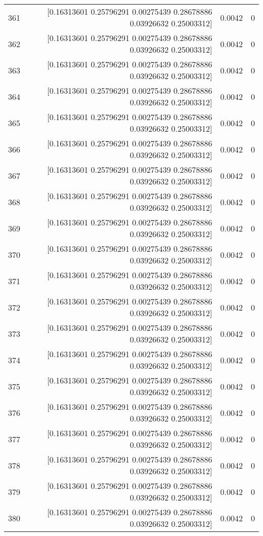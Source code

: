 \begin{longtable}{lrrr}
361 & [0.16313601 0.25796291 0.00275439 0.28678886 0.03926632 0.25003312] & 0.0042 & 0 \\
362 & [0.16313601 0.25796291 0.00275439 0.28678886 0.03926632 0.25003312] & 0.0042 & 0 \\
363 & [0.16313601 0.25796291 0.00275439 0.28678886 0.03926632 0.25003312] & 0.0042 & 0 \\
364 & [0.16313601 0.25796291 0.00275439 0.28678886 0.03926632 0.25003312] & 0.0042 & 0 \\
365 & [0.16313601 0.25796291 0.00275439 0.28678886 0.03926632 0.25003312] & 0.0042 & 0 \\
366 & [0.16313601 0.25796291 0.00275439 0.28678886 0.03926632 0.25003312] & 0.0042 & 0 \\
367 & [0.16313601 0.25796291 0.00275439 0.28678886 0.03926632 0.25003312] & 0.0042 & 0 \\
368 & [0.16313601 0.25796291 0.00275439 0.28678886 0.03926632 0.25003312] & 0.0042 & 0 \\
369 & [0.16313601 0.25796291 0.00275439 0.28678886 0.03926632 0.25003312] & 0.0042 & 0 \\
370 & [0.16313601 0.25796291 0.00275439 0.28678886 0.03926632 0.25003312] & 0.0042 & 0 \\
371 & [0.16313601 0.25796291 0.00275439 0.28678886 0.03926632 0.25003312] & 0.0042 & 0 \\
372 & [0.16313601 0.25796291 0.00275439 0.28678886 0.03926632 0.25003312] & 0.0042 & 0 \\
373 & [0.16313601 0.25796291 0.00275439 0.28678886 0.03926632 0.25003312] & 0.0042 & 0 \\
374 & [0.16313601 0.25796291 0.00275439 0.28678886 0.03926632 0.25003312] & 0.0042 & 0 \\
375 & [0.16313601 0.25796291 0.00275439 0.28678886 0.03926632 0.25003312] & 0.0042 & 0 \\
376 & [0.16313601 0.25796291 0.00275439 0.28678886 0.03926632 0.25003312] & 0.0042 & 0 \\
377 & [0.16313601 0.25796291 0.00275439 0.28678886 0.03926632 0.25003312] & 0.0042 & 0 \\
378 & [0.16313601 0.25796291 0.00275439 0.28678886 0.03926632 0.25003312] & 0.0042 & 0 \\
379 & [0.16313601 0.25796291 0.00275439 0.28678886 0.03926632 0.25003312] & 0.0042 & 0 \\
380 & [0.16313601 0.25796291 0.00275439 0.28678886 0.03926632 0.25003312] & 0.0042 & 0 \\

\end{longtable}
